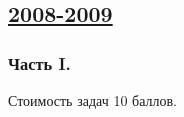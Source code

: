 \subsection[2008-2009]{\hyperref[sec:sol_kr_01_2008_2009]{2008-2009}}
\label{sec:kr_01_2008_2009}

\subsubsection*{Часть I.}

Стоимость задач 10 баллов.


